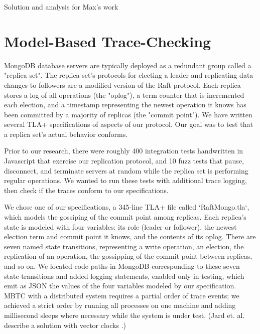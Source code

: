 \documentclass{vldb}
\begin{document}
Solution and analysis for Max's work

\section{Model-Based Trace-Checking}
\label{sec:model_based_trace_checking}

MongoDB database servers are typically deployed as a redundant group called a "replica set". The replica set's protocols for electing a leader and replicating data changes to followers are a modified version of the Raft protocol\cite{Ongaro14Raft}. Each replica stores a log of all operations (the "oplog"), a term counter that is incremented each election, and a timestamp representing the newest operation it knows has been committed by a majority of replicas (the "commit point"). We have written several TLA+ specifications of aspects of our protocol. Our goal was to test that a replica set's actual behavior conforms.

Prior to our research, there were roughly 400 integration tests handwritten in Javascript that exercise our replication protocol, and 10 fuzz tests that pause, disconnect, and terminate servers at random while the replica set is performing regular operations. We wanted to run these tests with additional trace logging, then check if the traces conform to our specifications.

We chose one of our specifications, a 345-line TLA+ file called `RaftMongo.tla`, which models the gossiping of the commit point among replicas. Each replica's state is modeled with four variables: its role (leader or follower), the newest election term and commit point it knows, and the contents of its oplog. There are seven named state transitions, representing a write operation, an election, the replication of an operation, the gossipping of the commit point between replicas, and so on. 
We located code paths in MongoDB corresponding to these seven state transitions and added logging statements, enabled only in testing, which emit as JSON the values of the four variables modeled by our specification. 
MBTC with a distributed system requires a partial order of trace events; we achieved a strict order by running all processes on one machine and adding millisecond sleeps where necessary while the system is under test. (Jard et. al. describe a solution with vector clocks \cite{Jard94GeneralApproachToTraceChecking}.)
\end{document}
